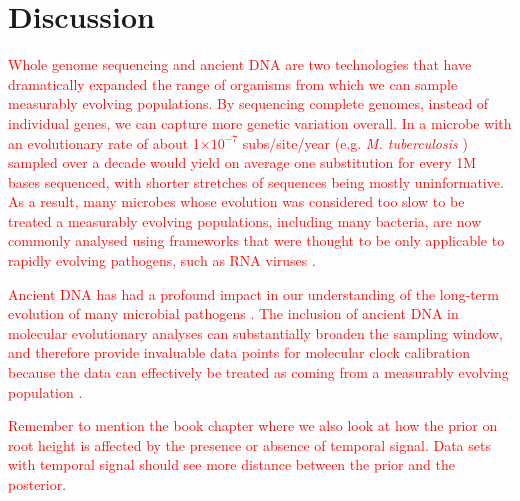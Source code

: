 \documentclass[10pt,letterpaper]{article}
\begin{document}
\section*{Discussion}



\textcolor{red}{
Whole genome sequencing and ancient DNA are two technologies that have dramatically expanded the range of organisms from which we can sample measurably evolving populations. By sequencing complete genomes, instead of individual genes, we can capture more genetic variation overall. In a microbe with an evolutionary rate of about 1$\times 10^{-7}$ subs/site/year (e.g. \textit{M. tuberculosis} \cite{menardo2019molecular}) sampled over a decade would yield on average one substitution for every 1M bases sequenced, with shorter stretches of sequences being mostly uninformative. As a result, many microbes whose evolution was considered too slow to be treated a measurably evolving populations, including many bacteria, are now commonly analysed using frameworks that were thought to be only applicable to rapidly evolving pathogens, such as RNA viruses \cite{biek2015measurably}.}

\textcolor{red}{Ancient DNA has had a profound impact in our understanding of the long-term evolution of many microbial pathogens \cite{duchene2020recovery,spyrou2019ancient}. The inclusion of ancient DNA in molecular evolutionary analyses can substantially broaden the sampling window, and therefore provide invaluable data points for molecular clock calibration because the data can effectively be treated as coming from a measurably evolving population \cite{ho2020dating}.}

\textcolor{red}{Remember to mention the book chapter where we also look at how the prior on root height is affected by the presence or absence of temporal signal. Data sets with temporal signal should see more distance between the prior and the posterior. }
\end{document}
